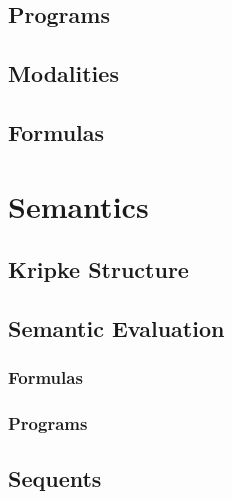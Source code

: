 \documentclass[a4paper, 11pt, accentcolor = tud3b]{tudreport}
\begin{document}
            \subsection{Programs} %

            \subsection{Modalities} %

            \subsection{Formulas} %

        \section{Semantics} %

            \subsection{Kripke Structure} %

            \subsection{Semantic Evaluation} %

                \subsubsection{Formulas} %

                \subsubsection{Programs} %

            \subsection{Sequents} %
\end{document}
